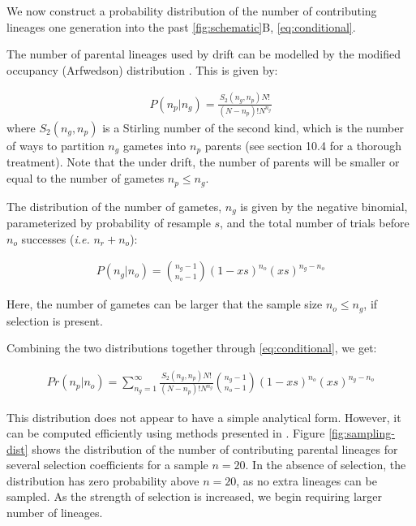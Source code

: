 \documentclass[review]{elsarticle}
\begin{document}
We now construct a probability distribution of the number of contributing lineages one generation
into the past \ref{fig:schematic}B, \eqref{eq:conditional}. 

The number of parental lineages used by drift can be modelled by the modified occupancy
(Arfwedson) distribution \citep{Wakeley2009,ONeill2019,JohnsonEtAl2005}. This is given by:

\begin{align}
  \label{eq:occupancy}
  P(n_p|n_g) = \frac{S_2(n_g,n_p) N!}{(N-n_p)! N^{n_g}}
\end{align}
where $S_2(n_g,n_p)$ is a Stirling number of the second kind, which is the number of ways to partition
$n_g$ gametes into $n_p$ parents (see \cite{JohnsonEtAl2005} section 10.4 for a thorough treatment).
Note that the under drift, the number of parents will be smaller or equal to the number of gametes
$n_p \le n_g$.

The distribution of the number of gametes, $n_g$ is given by the negative binomial, parameterized by
probability of resample $s$, and the total number of trials before $n_o$ successes (\textit{i.e.}
$n_r+n_o$):

\begin{align}
  \label{eq:neg-binomial-trials}
  P(n_g|n_o) = \binom{n_g-1}{n_o-1}(1-xs)^{n_o}(xs)^{n_g-n_o}
\end{align}

Here, the number of gametes can be larger that the sample size $n_o \le n_g$, if selection is present.

Combining the two distributions together through \ref{eq:conditional}, we get:

\begin{align}
  \label{eq:lineages-in-past}
   Pr(n_p|n_o) = \sum_{n_g=1}^{\infty} \frac{S_2(n_g,n_p) N!}{(N-n_p)! N^{n_g}} \binom{n_g-1}{n_o-1}(1-xs)^{n_o}(xs)^{n_g-n_o}
\end{align}

This distribution does not appear to have a simple analytical form. However, it can be computed
efficiently using methods presented in \citep{ONeill2019}. Figure \ref{fig:sampling-dist} shows the
distribution of the number of contributing parental lineages for several selection coefficients for
a sample $n=20$. In the absence of selection, the distribution has zero probability above $n=20$, as
no extra lineages can be sampled. As the strength of selection is increased, we begin requiring
larger number of lineages.
\end{document}
